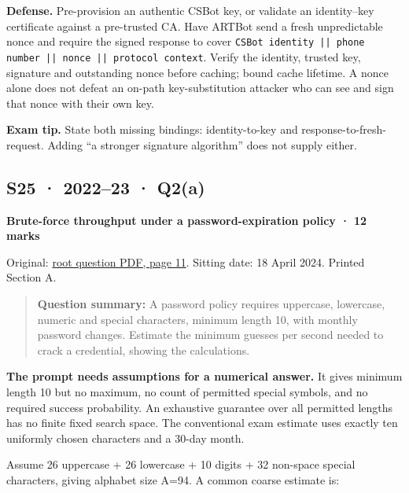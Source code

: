 \documentclass[11pt,a4paper]{article}
\begin{document}
\textbf{Defense.} Pre-provision an authentic CSBot key,\allowbreak{} or validate an identity–key certificate against a pre-trusted CA. Have ARTBot send a fresh unpredictable nonce and require the signed response to cover \texttt{CSBot identity || phone number || nonce || protocol context}. Verify the identity,\allowbreak{} trusted key,\allowbreak{} signature and outstanding nonce before caching; bound cache lifetime. A nonce alone does not defeat an on-path key-substitution attacker who can see and sign that nonce with their own key.



{\color{ForestGreen}\textbf{Exam tip.} State both missing bindings: identity-to-key and response-to-fresh-request. Adding “a stronger signature algorithm” does not supply either.}




\clearpage
\subsection{S25 · 2022–23 · Q2(a)}\label{s25}

\textbf{Brute-force throughput under a password-expiration policy · 12 marks}


Original: \href{../../CSE405-Security_Merged.pdf\#page=11}{root question PDF,\allowbreak{} page 11}. Sitting date: 18 April 2024. Printed Section A.



\begin{quote}\small

\textbf{Question summary:} A password policy requires uppercase,\allowbreak{} lowercase,\allowbreak{} numeric and special characters,\allowbreak{} minimum length 10,\allowbreak{} with monthly password changes. Estimate the minimum guesses per second needed to crack a credential,\allowbreak{} showing the calculations.



\end{quote}

\textbf{The prompt needs assumptions for a numerical answer.} It gives minimum length 10 but no maximum,\allowbreak{} no count of permitted special symbols,\allowbreak{} and no required success probability. An exhaustive guarantee over all permitted lengths has no finite fixed search space. The conventional exam estimate uses exactly ten uniformly chosen characters and a 30-day month.


Assume 26 uppercase + 26 lowercase + 10 digits + 32 non-space special characters,\allowbreak{} giving alphabet size A=\allowbreak{}94. A common coarse estimate is:
\end{document}
